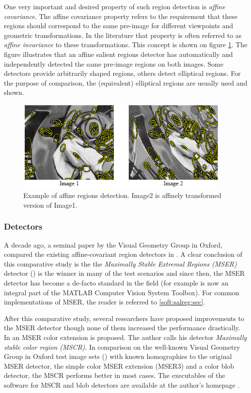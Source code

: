 One very important and desired property of such region detection is {\em affine covariance}.  The affine covariance property refers to the requirement that these regions should correspond to the same pre-image for different viewpoints and geometric transformations. In the literature that property is often referred to as {\em affine invariance} to these transformations. 
This concept is shown on figure \ref{fig:affreg}. The figure illustrates that an affine salient regions detector has automatically and independently detected the same pre-image regions on both images. Some detectors provide arbitrarily shaped regions, others detect elliptical regions. For the purpose of comparison, the (equivalent) elliptical regions are usually used and shown.
\begin{figure}[H]
\begin{center}
\includegraphics[width=0.95\textwidth]{fig/AffineRegions}
\end{center}
\caption{Example of affine regions detection. Image2 is affinely transformed version of Image1.}
\label{fig:affreg}
\end{figure}

\subsubsection{Detectors}
A decade ago, a seminal paper by the Visual Geometry Group in Oxford, compared the existing affine-covariant region detectors in \cite{Mikolajczyk:2005}. A clear conclusion of this comparative study is the the  {\em  Maximally Stable Extremal Regions (MSER)} detector (\cite{Matas2002BMVC}) is the winner in many of the test scenarios and since then, the MSER detector has become a de-facto standard in the field (for example is now an integral part of the MATLAB Computer Vision System Toolbox). For common implementations of MSER, the reader is referred to \ref{soft:salreg:sec}.

After this comparative study, several researchers have proposed improvements to the MSER detector though none of them increased the performance drastically. 
In \cite{Forssen07} an MSER color extension is proposed. The author calls his detector {\em Maximally stable color region (MSCR)}. In comparison on the well-known Visual Geometry Group in Oxford test image sets (\cite{vgg_soft_data}) with known homographies to the original MSER detector, the simple color MSER extension (MSER3) and a color blob detector, the MSCR performs better in most cases. The executables of the software for MSCR and blob detectors are available at the author's homepage \cite{forssen07_soft}.

